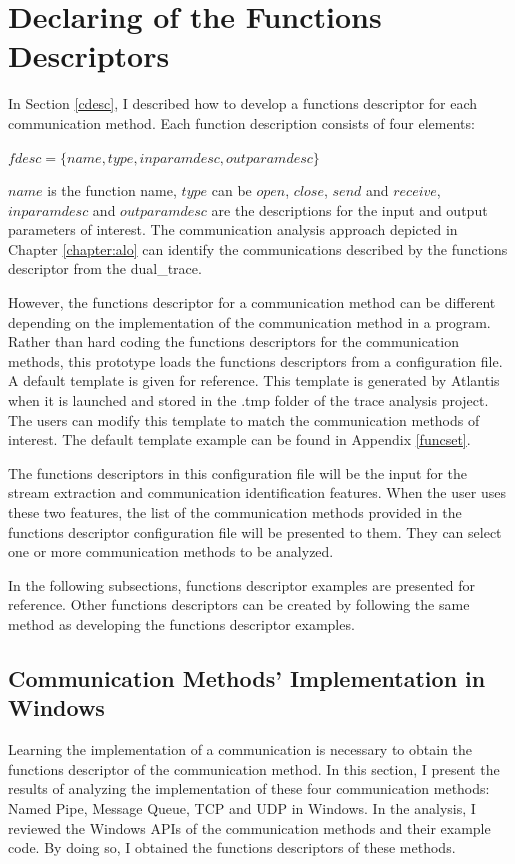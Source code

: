 \documentclass[12pt,oneside]{book}
\begin{document}
\section{Declaring of the Functions Descriptors}\label{functionset}
In Section \ref{cdesc}, I described how to develop a functions descriptor for each communication method. Each function description consists of four elements: 

$fdesc = \lbrace name, type, inparamdesc, outparamdesc \rbrace$

$name$ is the function name, $type$ can be $open$, $close$, $send$ and $receive$, $inparamdesc$ and $outparamdesc$ are the descriptions for the input and output parameters of interest. The communication analysis approach depicted in Chapter \ref{chapter:alo} can identify the communications described by the functions descriptor from the dual\_trace.

However, the functions descriptor for a communication method can be different depending on the implementation of the communication method in a program. Rather than hard coding the functions descriptors for the communication methods, this prototype loads the functions descriptors from a configuration file. A default template is given for reference. This template is generated by Atlantis when it is launched and stored in the .tmp folder of the trace analysis project. The users can modify this template to match the communication methods of interest. The default template example can be found in Appendix \ref{funcset}.

The functions descriptors in this configuration file will be the input for the stream extraction and communication identification features. When the user uses these two features, the list of the communication methods provided in the functions descriptor configuration file will be presented to them. They can select one or more communication methods to be analyzed. 

In the following subsections, functions descriptor examples are presented for reference. Other functions descriptors can be created by following the same method as developing the functions descriptor examples.

\subsection{Communication Methods' Implementation in Windows}\label{windows}
Learning the implementation of a communication is necessary to obtain the functions descriptor of the communication method. In this section, I present the results of analyzing the implementation of these four communication methods: Named Pipe, Message Queue, TCP and UDP in Windows. In the analysis, I reviewed the Windows APIs of the communication methods and their example code. By doing so, I obtained the functions descriptors of these methods. 
\end{document}
